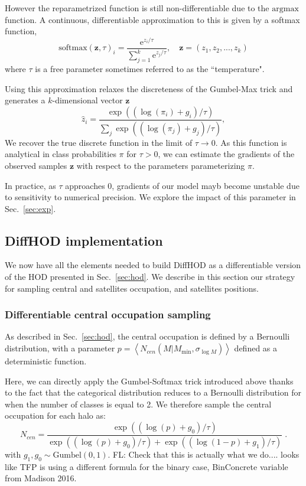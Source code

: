 \documentclass[a4paper,usenatbib]{mnras}
\newcommand{\FL}[1]{{\color{magenta}FL: #1}}
\begin{document}
However the reparametrized function is still non-differentiable due to the $\textrm{argmax}$ function.
A continuous, differentiable approximation to this is given by a softmax function, 
\begin{equation}
    \mathrm{softmax}(\mathbf{z}, \tau )_i = \frac{\mathrm{e}^{z_i/\tau}}{\sum_{j=1}^k \mathrm{e}^{z_j/\tau}}, \quad \mathbf{z} = (z_1, z_2,...,z_k)
 \end{equation}
where $\tau$ is a free parameter sometimes referred to as the ``temperature".

Using this approximation relaxes the discreteness of the Gumbel-Max trick and generates a $k$-dimensional vector $\mathbf{z}$ 
\begin{equation}
    \hat{z}_i = \frac{\exp((\log(\pi_i)+g_i)/\tau)}{\sum_j \exp((\log(\pi_j)+g_j)/\tau)},
    \label{eq:softmax}
\end{equation}
We recover the true discrete function in the limit of $\tau \rightarrow 0$.
As this function is analytical in class probabilities $\pi$ for $\tau > 0$,
we can estimate the gradients of the observed samples $\mathbf{z}$ with respect to the parameters parameterizing $\pi$.

In practice, as $\tau$ approaches 0, gradients of our model mayb become unstable due to sensitivity to numerical precision. We explore the impact of this parameter in Sec.~\ref{sec:exp}.

\subsection{DiffHOD implementation} \label{sec:dhod}

We now have all the elements needed to build DiffHOD as a differentiable version of the HOD presented in Sec.~\ref{sec:hod}. We describe in this section our strategy for sampling central and satellites occupation, and satellites positions.

\subsubsection{Differentiable central occupation sampling}

As described in Sec.~\ref{sec:hod}, the central occupation is defined by a Bernoulli distribution, with a parameter $p=\left\langle N_{cen}(M | M_\mathrm{min}, \sigma_{\log M})\right\rangle$ defined as a deterministic function. 

Here, we can directly apply the Gumbel-Softmax trick introduced above thanks to the fact that the categorical distribution reduces to a Bernoulli distribution for when the number of classes is equal to 2. We therefore sample the central occupation for each halo as:
\begin{equation}
 N_{cen} = \frac{\exp((\log(p)+g_0)/\tau)}{\exp((\log(p)+g_0)/\tau) + \exp((\log(1-p)+g_1)/\tau) }\;.   
\end{equation}
with $g_1,g_0 \sim \textrm{Gumbel}(0, 1)$.
\FL{Check that this is actually what we do.... looks like TFP is using a different formula for the binary case, BinConcrete variable from Madison 2016.}
\end{document}
